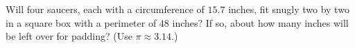 Will four saucers, each with a circumference of $15.7$ inches, fit snugly two by two in a square box with a perimeter of $48$ inches? If so, about how many inches will be left over for padding? (Use $\pi\approx3.14$.)
